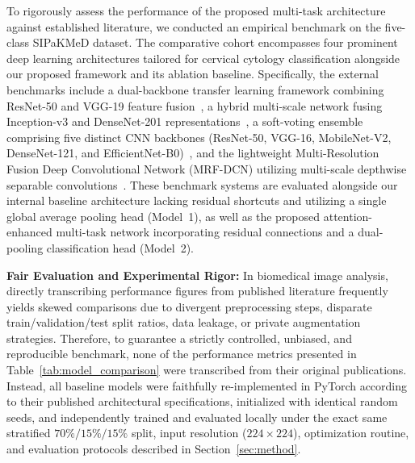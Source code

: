 \documentclass[pdflatex,sn-nature]{sn-jnl}%
\theoremstyle{thmstyleone}%
\theoremstyle{thmstyletwo}%
\theoremstyle{thmstylethree}%
\begin{document}
To rigorously assess the performance of the proposed multi-task architecture against established literature, we conducted an empirical benchmark on the five-class SIPaKMeD dataset. The comparative cohort encompasses four prominent deep learning architectures tailored for cervical cytology classification alongside our proposed framework and its ablation baseline. Specifically, the external benchmarks include a dual-backbone transfer learning framework combining ResNet-50 and VGG-19 feature fusion~\cite{sharma2025diagnosis}, a hybrid multi-scale network fusing Inception-v3 and DenseNet-201 representations~\cite{sharma2025enhancing}, a soft-voting ensemble comprising five distinct CNN backbones (ResNet-50, VGG-16, MobileNet-V2, DenseNet-121, and EfficientNet-B0)~\cite{Verma2025}, and the lightweight Multi-Resolution Fusion Deep Convolutional Network (MRF-DCN) utilizing multi-scale depthwise separable convolutions~\cite{shaik2025deeplearningenabledsegmentation}. These benchmark systems are evaluated alongside our internal baseline architecture lacking residual shortcuts and utilizing a single global average pooling head (Model~1), as well as the proposed attention-enhanced multi-task network incorporating residual connections and a dual-pooling classification head (Model~2).

\noindent \textbf{Fair Evaluation and Experimental Rigor:} In biomedical image analysis, directly transcribing performance figures from published literature frequently yields skewed comparisons due to divergent preprocessing steps, disparate train/validation/test split ratios, data leakage, or private augmentation strategies. Therefore, to guarantee a strictly controlled, unbiased, and reproducible benchmark, none of the performance metrics presented in Table~\ref{tab:model_comparison} were transcribed from their original publications. Instead, all baseline models were faithfully re-implemented in PyTorch according to their published architectural specifications, initialized with identical random seeds, and independently trained and evaluated locally under the exact same stratified $70\%/15\%/15\%$ split, input resolution ($224 \times 224$), optimization routine, and evaluation protocols described in Section~\ref{sec:method}.
\end{document}
